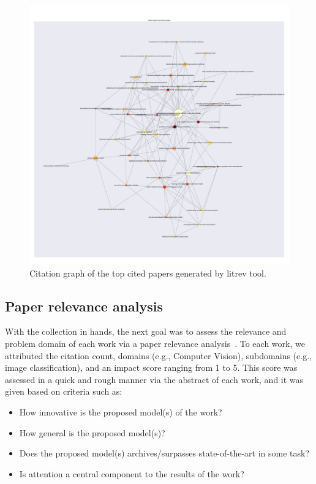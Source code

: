 \documentclass[12pt]{article}
\begin{document}
\begin{figure}
\begin{center}
    \includegraphics[width=0.7\linewidth]{./img/titles-graph.pdf}
\caption{
    Citation graph of the top cited papers generated by litrev tool.
}
\label{fig:citations}
\end{center}
\end{figure}

\subsection{Paper relevance analysis}
With the collection in hands, the next goal was to assess the relevance and problem domain of each work
via a paper relevance analysis~\cite{ref:paper-relevance}.
To each work, we attributed the citation count, domains (e.g., Computer Vision), subdomains (e.g., image classification), and an impact score ranging from 1 to 5. This score was assessed in a quick and rough manner via the abstract of each
work, and it was given based on criteria such as:
\begin{itemize}
    \item How innovative is the proposed model(s) of the work?
    \item How general is the proposed model(s)?
    \item Does the proposed model(s) archives/surpasses state-of-the-art in some task?
    \item Is attention a central component to the results of the work?
\end{itemize}
\end{document}
